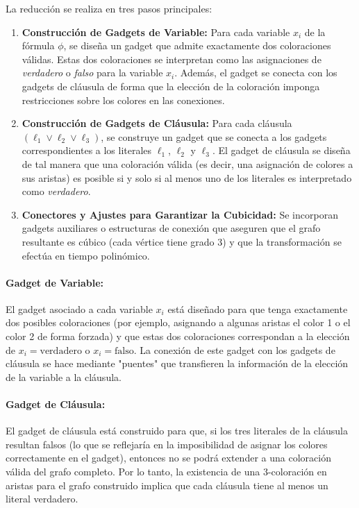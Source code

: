 \documentclass[a4paper]{article}
\begin{document}
La reducción se realiza en tres pasos principales:

\begin{enumerate}
    \item \textbf{Construcción de Gadgets de Variable:}  
    Para cada variable $x_i$ de la fórmula $\phi$, se diseña un gadget que admite exactamente dos coloraciones válidas. Estas dos coloraciones se interpretan como las asignaciones de \emph{verdadero} o \emph{falso} para la variable $x_i$. Además, el gadget se conecta con los gadgets de cláusula de forma que la elección de la coloración imponga restricciones sobre los colores en las conexiones.

    \item \textbf{Construcción de Gadgets de Cláusula:}  
    Para cada cláusula $(\ell_1 \lor \ell_2 \lor \ell_3)$, se construye un gadget que se conecta a los gadgets correspondientes a los literales $\ell_1$, $\ell_2$ y $\ell_3$. El gadget de cláusula se diseña de tal manera que una coloración válida (es decir, una asignación de colores a sus aristas) es posible si y solo si al menos uno de los literales es interpretado como \emph{verdadero}.

    \item \textbf{Conectores y Ajustes para Garantizar la Cubicidad:}  
    Se incorporan gadgets auxiliares o estructuras de conexión que aseguren que el grafo resultante es cúbico (cada vértice tiene grado 3) y que la transformación se efectúa en tiempo polinómico.
\end{enumerate}

\paragraph{Gadget de Variable:}  
El gadget asociado a cada variable $x_i$ está diseñado para que tenga exactamente dos posibles coloraciones (por ejemplo, asignando a algunas aristas el color 1 o el color 2 de forma forzada) y que estas dos coloraciones correspondan a la elección de $x_i=\text{verdadero}$ o $x_i=\text{falso}$. La conexión de este gadget con los gadgets de cláusula se hace mediante "puentes" que transfieren la información de la elección de la variable a la cláusula.

\paragraph{Gadget de Cláusula:}  
El gadget de cláusula está construido para que, si los tres literales de la cláusula resultan falsos (lo que se reflejaría en la imposibilidad de asignar los colores correctamente en el gadget), entonces no se podrá extender a una coloración válida del grafo completo. Por lo tanto, la existencia de una 3-coloración en aristas para el grafo construido implica que cada cláusula tiene al menos un literal verdadero.
\end{document}
